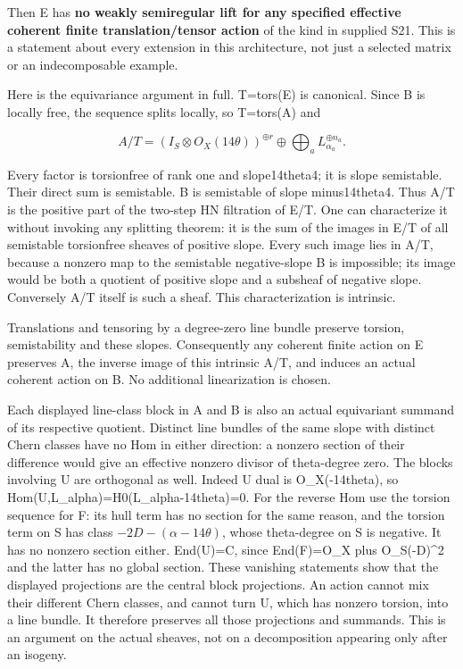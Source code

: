 Then E has \textbf{no weakly semiregular lift for any specified effective
coherent finite translation/tensor action} of the kind in supplied S21. This
is a statement about every extension in this architecture, not just a
selected matrix or an indecomposable example.

Here is the equivariance argument in full. T=tors(E) is canonical. Since B
is locally free, the sequence splits locally, so T=tors(A) and

\[
 A/T=(I_S\otimes O_X(14\theta))^{\oplus r}
       \oplus\bigoplus_a L_{\alpha_a}^{\oplus n_a}.
 \tag{E826.5}
\]

Every factor is torsionfree of rank one and slope14theta4; it is slope
semistable. Their direct sum is semistable. B is semistable of slope
minus14theta4. Thus A/T is the positive part of the two-step HN filtration
of E/T. One can characterize it without invoking any splitting theorem: it
is the sum of the images in E/T of all semistable torsionfree sheaves of
positive slope. Every such image lies in A/T, because a nonzero map to the
semistable negative-slope B is impossible; its image would be both a
quotient of positive slope and a subsheaf of negative slope. Conversely A/T
itself is such a sheaf. This characterization is intrinsic.

Translations and tensoring by a degree-zero line bundle preserve torsion,
semistability and these slopes. Consequently any coherent finite action on E
preserves A, the inverse image of this intrinsic A/T, and induces an actual
coherent action on B. No additional linearization is chosen.

Each displayed line-class block in A and B is also an actual equivariant
summand of its respective quotient. Distinct line bundles of the same slope
with distinct Chern classes have no Hom in either direction: a nonzero
section of their difference would give an effective nonzero divisor of
theta-degree zero. The blocks involving U are orthogonal as well. Indeed U
dual is O\_X(-14theta), so Hom(U,L\_alpha)=H0(L\_alpha-14theta)=0. For the
reverse Hom use the torsion sequence for F: its hull term has no section for
the same reason, and the torsion term on S has class
\(-2D-(\alpha-14\theta)\), whose theta-degree on S is negative. It has no
nonzero section either. End(U)=C, since End(F)=O\_X plus O\_S(-D)\^{}2 and
the latter has no global section. These vanishing statements show that the
displayed projections are the central block projections. An action cannot
mix their different Chern classes, and cannot turn U, which has nonzero
torsion, into a line bundle. It therefore preserves all those projections
and summands. This is an argument on the actual sheaves, not on a
decomposition appearing only after an isogeny.

